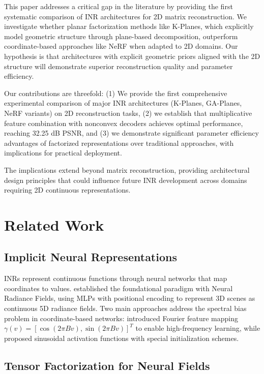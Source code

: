 \documentclass{article}
\begin{document}
This paper addresses a critical gap in the literature by providing the first systematic comparison of INR architectures for 2D matrix reconstruction. We investigate whether planar factorization methods like K-Planes, which explicitly model geometric structure through plane-based decomposition, outperform coordinate-based approaches like NeRF when adapted to 2D domains. Our hypothesis is that architectures with explicit geometric priors aligned with the 2D structure will demonstrate superior reconstruction quality and parameter efficiency.

Our contributions are threefold: (1) We provide the first comprehensive experimental comparison of major INR architectures (K-Planes, GA-Planes, NeRF variants) on 2D reconstruction tasks, (2) we establish that multiplicative feature combination with nonconvex decoders achieves optimal performance, reaching 32.25 dB PSNR, and (3) we demonstrate significant parameter efficiency advantages of factorized representations over traditional approaches, with implications for practical deployment.

The implications extend beyond matrix reconstruction, providing architectural design principles that could influence future INR development across domains requiring 2D continuous representations.

\section{Related Work}

\subsection{Implicit Neural Representations}

INRs represent continuous functions through neural networks that map coordinates to values. \cite{mildenhall2020nerf} established the foundational paradigm with Neural Radiance Fields, using MLPs with positional encoding to represent 3D scenes as continuous 5D radiance fields. Two main approaches address the spectral bias problem in coordinate-based networks: \cite{tancik2020fourier} introduced Fourier feature mapping $\gamma(v) = [\cos(2\pi Bv), \sin(2\pi Bv)]^T$ to enable high-frequency learning, while \cite{sitzmann2020siren} proposed sinusoidal activation functions with special initialization schemes.

\subsection{Tensor Factorization for Neural Fields}
\end{document}
